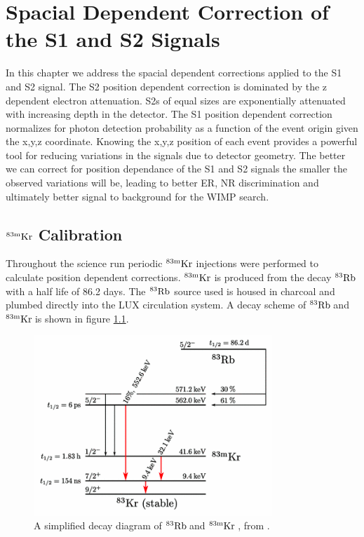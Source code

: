 
\renewcommand{\thechapter}{3}
\newcommand{\KrCal}{$\rm^{83m}Kr \: $}
\newcommand{\Rb}{$\rm^{83}Rb \: $}

\chapter{Spacial Dependent Correction of the S1 and S2 Signals}
\label{Ch:3}

In this chapter we address the spacial dependent corrections applied to the S1 and S2 signal. The S2 position dependent correction is dominated by the z dependent electron attenuation. S2s of equal sizes are exponentially attenuated with increasing depth in the detector. The S1 position dependent correction normalizes for photon detection probability as a function of the event origin given the x,y,z coordinate. %
Knowing the x,y,z position of each event provides a powerful tool for reducing variations in the signals due to detector geometry. The better we can correct for position dependance of the S1 and S2 signals the smaller the observed variations will be, leading to better ER, NR discrimination and ultimately better signal to background for the WIMP search. 

\section{$\rm^{83m}Kr$ Calibration}

Throughout the science run periodic $\rm^{83m}Kr$ injections were performed to calculate position dependent corrections. $\rm ^{83m}Kr$ is produced from the decay $\rm^{83}Rb$ with a half life of 86.2 days. The $\rm^{83}Rb$ source used is housed in charcoal and plumbed directly into the LUX circulation system. A decay scheme of \Rb and \KrCal is shown in figure \ref{fig:Kr_Decay}.

\begin{figure}[h!]\centering
\includegraphics[width=90mm]{Chapter_XYZ_Corr/Thesis_Corr_Plots/RbKr_83_Decay.png}
\caption{A simplified decay diagram of \Rb and \KrCal, from \cite{Kr_Decay_Diagram}.}
\label{fig:Kr_Decay}
\end{figure}

